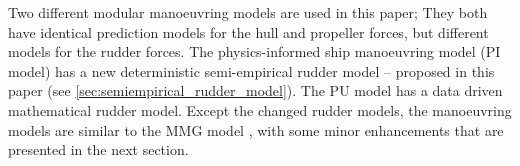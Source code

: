 Two different modular manoeuvring models are used in this paper; They both have identical prediction models for the hull and propeller forces, but different models for the rudder forces. The physics-informed ship manoeuvring model (PI model) has a new deterministic semi-empirical rudder model -- proposed in this paper (see \autoref{sec:semiempirical_rudder_model}). The PU model has a data driven mathematical rudder model. 
Except the changed rudder models, the manoeuvring models are similar to the MMG model \citep{yasukawa_introduction_2015}, with some minor enhancements that are presented in the next section.
